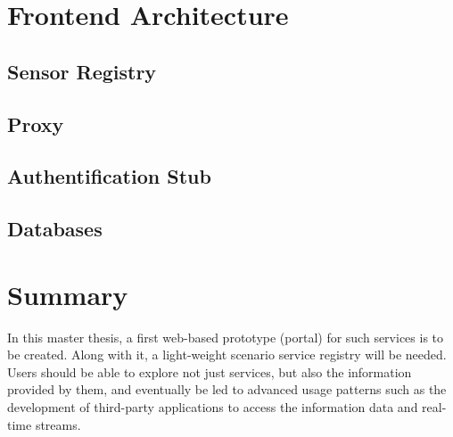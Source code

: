 \section{Frontend Architecture}
\subsection{Sensor Registry}
\subsection{Proxy}
\subsection{Authentification Stub}
\subsection{Databases}

\section{Summary}
In this master thesis, a first web-based prototype (portal) for such services is to be
created. Along with it, a light-weight scenario service registry will be needed. Users
should be able to explore not just services, but also the information provided by
them, and eventually be led to advanced usage patterns such as the development
of third-party applications to access the information data and real-time streams.